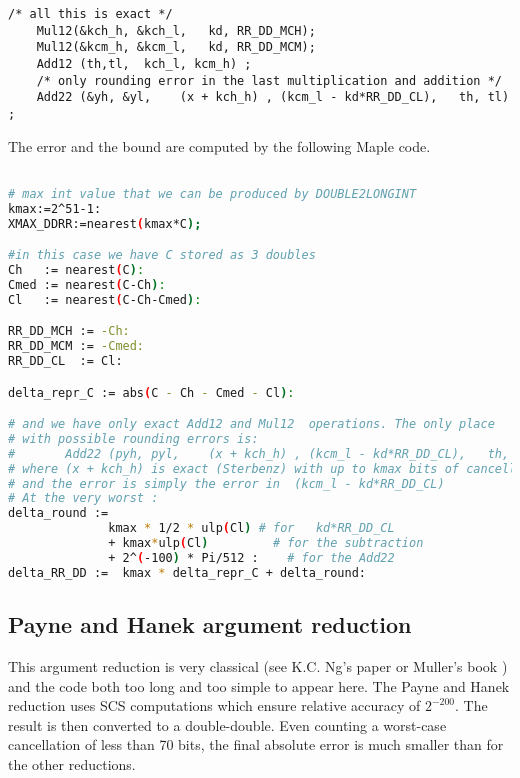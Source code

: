 \begin{lstlisting}[caption={Cody and Waite argument reduction in
    double-double},firstnumber=20]
    /* all this is exact */
    Mul12(&kch_h, &kch_l,   kd, RR_DD_MCH);
    Mul12(&kcm_h, &kcm_l,   kd, RR_DD_MCM);
    Add12 (th,tl,  kch_l, kcm_h) ;
    /* only rounding error in the last multiplication and addition */ 
    Add22 (&yh, &yl,    (x + kch_h) , (kcm_l - kd*RR_DD_CL),   th, tl) ;
\end{lstlisting}


The error and the bound are computed by the following Maple code.

\begin{lstlisting}[caption={Maple script for computing constants for Cody and Waite
    double-double\label{trigo:lst:cwddrmaple}},
  language={sh}, numbers=none]% of course it's maple
%Skip a line here, I don't know why, otherwise latex eats the first line

# max int value that we can be produced by DOUBLE2LONGINT
kmax:=2^51-1:
XMAX_DDRR:=nearest(kmax*C);

#in this case we have C stored as 3 doubles
Ch   := nearest(C):
Cmed := nearest(C-Ch):
Cl   := nearest(C-Ch-Cmed):

RR_DD_MCH := -Ch:
RR_DD_MCM := -Cmed:
RR_DD_CL  := Cl:

delta_repr_C := abs(C - Ch - Cmed - Cl):

# and we have only exact Add12 and Mul12  operations. The only place
# with possible rounding errors is:
#       Add22 (pyh, pyl,    (x + kch_h) , (kcm_l - kd*RR_DD_CL),   th, tl) ;
# where (x + kch_h) is exact (Sterbenz) with up to kmax bits of cancellation
# and the error is simply the error in  (kcm_l - kd*RR_DD_CL)
# At the very worst :
delta_round :=
              kmax * 1/2 * ulp(Cl) # for   kd*RR_DD_CL
              + kmax*ulp(Cl)         # for the subtraction
              + 2^(-100) * Pi/512 :    # for the Add22
delta_RR_DD :=  kmax * delta_repr_C + delta_round:
\end{lstlisting}


\subsection{Payne and Hanek argument reduction }

This argument reduction is very classical (see K.C. Ng's
paper\cite{Ng1992} or Muller's book \cite{Muller97}) and the code both
too long and too simple to appear here. The Payne and Hanek reduction
uses SCS computations which ensure relative accuracy of $2^{-200}$.
The result is then converted to a double-double.  Even counting a
worst-case cancellation of less than 70 bits, the final absolute error
is much smaller than for the other reductions.

